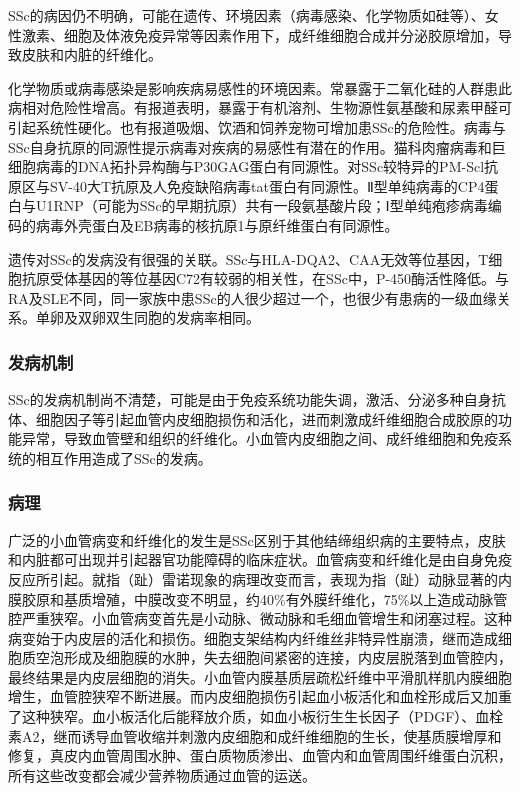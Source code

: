 SSc的病因仍不明确，可能在遗传、环境因素（病毒感染、化学物质如硅等）、女性激素、细胞及体液免疫异常等因素作用下，成纤维细胞合成并分泌胶原增加，导致皮肤和内脏的纤维化。

化学物质或病毒感染是影响疾病易感性的环境因素。常暴露于二氧化硅的人群患此病相对危险性增高。有报道表明，暴露于有机溶剂、生物源性氨基酸和尿素甲醛可引起系统性硬化。也有报道吸烟、饮酒和饲养宠物可增加患SSc的危险性。病毒与SSc自身抗原的同源性提示病毒对疾病的易感性有潜在的作用。猫科肉瘤病毒和巨细胞病毒的DNA拓扑异构酶与P30GAG蛋白有同源性。对SSc较特异的PM-Scl抗原区与SV-40大T抗原及人免疫缺陷病毒tat蛋白有同源性。Ⅱ型单纯病毒的CP4蛋白与U1RNP（可能为SSc的早期抗原）共有一段氨基酸片段；Ⅰ型单纯疱疹病毒编码的病毒外壳蛋白及EB病毒的核抗原1与原纤维蛋白有同源性。

遗传对SSc的发病没有很强的关联。SSc与HLA-DQA2、CAA无效等位基因，T细胞抗原受体基因的等位基因C72有较弱的相关性，在SSc中，P-450酶活性降低。与RA及SLE不同，同一家族中患SSc的人很少超过一个，也很少有患病的一级血缘关系。单卵及双卵双生同胞的发病率相同。

\subsubsection{发病机制}

SSc的发病机制尚不清楚，可能是由于免疫系统功能失调，激活、分泌多种自身抗体、细胞因子等引起血管内皮细胞损伤和活化，进而刺激成纤维细胞合成胶原的功能异常，导致血管壁和组织的纤维化。小血管内皮细胞之间、成纤维细胞和免疫系统的相互作用造成了SSc的发病。

\subsubsection{病理}

广泛的小血管病变和纤维化的发生是SSc区别于其他结缔组织病的主要特点，皮肤和内脏都可出现并引起器官功能障碍的临床症状。血管病变和纤维化是由自身免疫反应所引起。就指（趾）雷诺现象的病理改变而言，表现为指（趾）动脉显著的内膜胶原和基质增殖，中膜改变不明显，约40\%有外膜纤维化，75\%以上造成动脉管腔严重狭窄。小血管病变首先是小动脉、微动脉和毛细血管增生和闭塞过程。这种病变始于内皮层的活化和损伤。细胞支架结构内纤维丝非特异性崩溃，继而造成细胞质空泡形成及细胞膜的水肿，失去细胞间紧密的连接，内皮层脱落到血管腔内，最终结果是内皮层细胞的消失。小血管内膜基质层疏松纤维中平滑肌样肌内膜细胞增生，血管腔狭窄不断进展。而内皮细胞损伤引起血小板活化和血栓形成后又加重了这种狭窄。血小板活化后能释放介质，如血小板衍生生长因子（PDGF）、血栓素A2，继而诱导血管收缩并刺激内皮细胞和成纤维细胞的生长，使基质膜增厚和修复，真皮内血管周围水肿、蛋白质物质渗出、血管内和血管周围纤维蛋白沉积，所有这些改变都会减少营养物质通过血管的运送。


